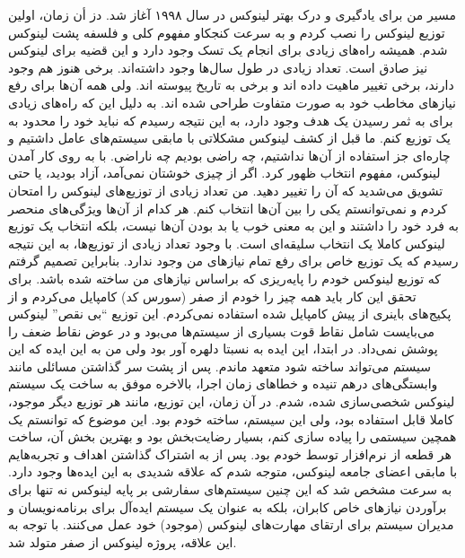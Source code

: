 \documentclass{book}
\begin{document}
مسیر من برای یادگیری و درک بهتر لینوکس در سال ۱۹۹۸ آغاز شد. دز أن زمان، اولین توزیع لینوکس را نصب کردم و به سرعت کنجکاو مفهوم کلی و فلسفه پشت لینوکس شدم.
\newline
\newline
همیشه راه‌های زیادی برای انجام یک تسک وجود دارد و این قضیه برای لینوکس نیز صادق است. تعداد زیادی در طول سال‌ها وجود داشته‌اند. برخی هنوز هم وجود دارند، برخی تغییر ماهیت داده اند و برخی به تاریخ پیوسته اند. ولی همه آن‌ها برای رفع نیاز‌های مخاطب خود به صورت متفاوت طراحی شده اند. به دلیل این که راه‌های زیادی برای به ثمر رسیدن یک هدف وجود دارد، به این نتیجه رسیدم که نباید خود را محدود به یک توزیع کنم. ما قبل از کشف لینوکس مشکلاتی با مابقی سیستم‌های عامل داشتیم و چاره‌ای جز استفاده از آن‌ها نداشتیم، چه راضی بودیم چه ناراضی. با به روی کار آمدن لینوکس، مفهوم انتخاب ظهور کرد. اگر از چیزی خوشتان نمی‌آمد، آزاد بودید، یا حتی تشویق می‌شدید که آن را تغییر دهید.
\newline
\newline
من تعداد زیادی از توزیع‌های لینوکس را امتحان کردم و نمی‌توانستم یکی را بین آن‌ها انتخاب کنم. هر کدام از آن‌ها ویژگی‌های منحصر به فرد خود را داشتند و این به معنی خوب یا بد بودن آن‌ها نیست، بلکه انتخاب یک توزیع لینوکس کاملا یک انتخاب سلیقه‌ای است. با وجود تعداد زیادی از توزیع‌ها، به این نتیجه رسیدم که یک توزیع خاص برای رفع تمام نیاز‌های من وجود ندارد. بنابراین تصمیم گرفتم که توزیع لینوکس خودم را پایه‌ریزی که براساس نیاز‌های من ساخته شده باشد.
\newline
\newline
برای تحقق این کار باید همه چیز را خودم از صفر (سورس کد) کامپایل می‌کردم و از پکیج‌های باینری از پیش کامپایل شده استفاده نمی‌کردم. این توزیع “بی نقص” لینوکس می‌بایست شامل نقاط قوت بسیاری از سیستم‌ها می‌بود و در عوض نقاط ضعف را پوشش نمی‌داد. در ابتدا، این ایده به نسبتا دلهره آور بود ولی من به این ایده که این سیستم می‌تواند ساخته شود متعهد ماندم.
\newline
\newline
پس از پشت سر گذاشتن مسائلی مانند وابستگی‌های درهم تنیده و خطا‌های زمان اجرا، بالاخره موفق به ساخت یک سیستم لینوکس شخصی‌سازی شده، شدم. در آن زمان، این توزیع، مانند هر توزیع دیگر موجود، کاملا قابل استفاده بود، ولی این سیستم، ساخته خودم بود. این موضوع که توانستم یک همچین سیستمی را پیاده سازی کنم، بسیار رضایت‌بخش بود و بهترین بخش آن، ساخت هر قطعه از نرم‌افزار توسط خودم بود.
\newline
\newline
پس از به اشتراک گذاشتن اهداف و تجربه‌هایم با مابقی اعضای جامعه لینوکس، متوجه شدم که علاقه شدیدی به این ایده‌ها وجود دارد. به سرعت مشخص شد که این چنین سیستم‌های سفارشی بر پایه لینوکس نه تنها برای برآوردن نیاز‌های خاص کابران، بلکه به عنوان یک سیستم ایده‌آل برای برنامه‌نویسان و مدیران سیستم برای ارتقای مهارت‌های لینوکس (موجود) خود عمل می‌کنند. با توجه به این علاقه، پروژه لینوکس از صفر متولد شد.
\end{document}
